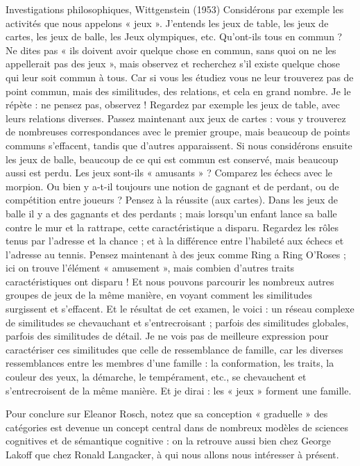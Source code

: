 \begin{lecture}{Investigations philosophiques, Wittgenstein (1953)}
Considérons par exemple les activités que nous appelons « jeux ». J'entends les jeux de table, les jeux de cartes, les jeux de balle, les Jeux olympiques, etc. Qu'ont-ils tous en commun ? Ne dites pas « ils doivent avoir quelque chose en commun, sans quoi on ne les appellerait pas des jeux », mais observez et recherchez s'il existe quelque chose qui leur soit commun à tous. Car si vous les étudiez vous ne leur trouverez pas de point commun, mais des similitudes, des relations, et cela en grand nombre. Je le répète : ne pensez pas, observez ! Regardez par exemple les jeux de table, avec leurs relations diverses. Passez maintenant aux jeux de cartes : vous y trouverez de nombreuses correspondances avec le premier groupe, mais beaucoup de points communs s’effacent, tandis que d'autres apparaissent. Si nous considérons ensuite les jeux de balle, beaucoup de ce qui est commun est conservé, mais beaucoup aussi est perdu. Les jeux sont-ils « amusants » ? Comparez les échecs avec le morpion. Ou bien y a-t-il toujours une notion de gagnant et de perdant, ou de compétition entre joueurs ? Pensez à la réussite (aux cartes). Dans les jeux de balle il y a des gagnants et des perdants ; mais lorsqu'un enfant lance sa balle contre le mur et la rattrape, cette caractéristique a disparu. Regardez les rôles tenus par l'adresse et la chance ; et à la différence entre l'habileté aux échecs et l'adresse au tennis. Pensez maintenant à des jeux comme Ring a Ring O'Roses ; ici on trouve l'élément « amusement », mais combien d'autres traits caractéristiques ont disparu ! Et nous pouvons parcourir les nombreux autres groupes de jeux de la même manière, en voyant comment les similitudes surgissent et s'effacent. Et le résultat de cet examen, le voici : un réseau complexe de similitudes se chevauchant et s'entrecroisant ; parfois des similitudes globales, parfois des similitudes de détail. Je ne vois pas de meilleure expression pour caractériser ces similitudes que celle de ressemblance de famille, car les diverses ressemblances entre les membres d'une famille : la conformation, les traits, la couleur des yeux, la démarche, le tempérament, etc., se chevauchent et s'entrecroisent de la même manière. Et je dirai : les « jeux » forment une famille.
\end{lecture}
 Pour conclure sur Eleanor Rosch, notez que sa conception « graduelle » des catégories est devenue un concept central dans de nombreux modèles de sciences cognitives et de sémantique cognitive : on la retrouve aussi bien chez George Lakoff que chez Ronald Langacker, à qui nous allons nous intéresser à présent.\par

